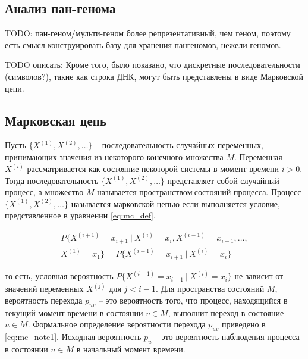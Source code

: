 \subsection{Анализ пан-генома}

TODO: пан-геном/мульти-геном более репрезентативный, чем геном, поэтому есть смысл конструировать базу для хранения пангеномов, нежели геномов. 

TODO описать: Кроме того, было показано, что дискретные последовательности (символов?), такие как строка ДНК, могут быть представлены в виде Марковской цепи\cite{17_heath2021computing}.

\subsection{Марковская цепь}

Пусть $ \{X^{\left(1\right)},X^{\left(2\right)},\ldots\} $ -- последовательность случайных переменных, принимающих значения из некоторого конечного множества $ M $. Переменная $ X^{\left(i\right)} $ рассматривается как состояние некоторой системы в момент времени $ i > 0 $. Тогда последовательность $ \{X^{\left(1\right)},X^{\left(2\right)},\ldots\} $ представляет собой случайный процесс, а множество $ M $ называется $ пространством\ состояний $ процесса. Процесс $ \{X^{\left(1\right)},X^{\left(2\right)},\ldots\} $ называется марковской цепью\cite{14_billingsley1961statistical} если выполняется условие, представленное в уравнении \ref{eq:mc_def}.

\begin{equation}
	\begin{split}
		P\{X^{\left(i+1\right)}=x_{i+1}\ \vert \ X^{\left(i\right)}=x_i,X^{\left(i-1\right)}=x_{i-1},\ldots, \\
		X^{\left(1\right)}=x_1\}=P\{X^{\left(i+1\right)}=x_{i+1}\ \vert \ X^{\left(i\right)}=x_i\}
	\end{split}
	\label{eq:mc_def}
\end{equation}

то есть, условная вероятность $ P\{X^{\left(i+1\right)}=x_{i+1}\ \vert \ X^{\left(i\right)}=x_i\} $ не зависит от значений переменных $ X^{\left(j\right)} $ для $ j<i-1 $. Для пространства состояний $ M $, вероятность перехода $ p_{uv} $ -- это вероятность того, что процесс, находящийся в текущий момент времени в состоянии  $ v \in M $, выполнит переход в состояние $ u \in M $. Формальное определение вероятности перехода $ p_{uv} $ приведено в \ref{eq:mc_note1}. Исходная вероятность $ p_u $ -- это вероятность наблюдения процесса в состоянии $ u \in M $ в начальный момент времени.

